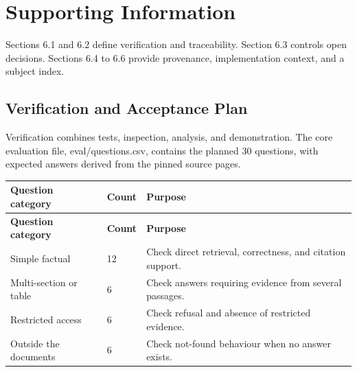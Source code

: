\documentclass[11pt,letterpaper]{article}
\begin{document}
\clearpage

\section{Supporting Information}

Sections 6.1 and 6.2 define verification and traceability. Section 6.3 controls open decisions. Sections 6.4 to 6.6 provide provenance, implementation context, and a subject index.\par

\subsection{Verification and Acceptance Plan}

Verification combines tests, inspection, analysis, and demonstration. The core evaluation file, eval/questions.csv, contains the planned 30 questions, with expected answers derived from the pinned source pages.\par

\begingroup\small

\begin{longtable}{|P{\arrayrulewidth\relax}|P{\arrayrulewidth\relax}|P{\arrayrulewidth\relax}|}

\hline{}

\textbf{Question category} & \textbf{Count} & \textbf{Purpose} \\ \hline

\endfirsthead

\hline{}

\textbf{Question category} & \textbf{Count} & \textbf{Purpose} \\ \hline

\endhead

\hline\endfoot

\hline\endlastfoot

Simple factual & 12 & Check direct retrieval, correctness, and citation support. \\ \hline

Multi-section or table & 6 & Check answers requiring evidence from several passages. \\ \hline

Restricted access & 6 & Check refusal and absence of restricted evidence. \\ \hline

Outside the documents & 6 & Check not-found behaviour when no answer exists. \\ \hline

\end{longtable}
\end{document}
